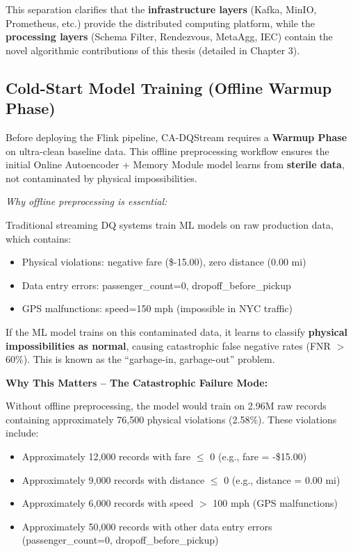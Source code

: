 This separation clarifies that the \textbf{infrastructure layers} (Kafka, MinIO, Prometheus, etc.) provide the distributed computing platform, while the \textbf{processing layers} (Schema Filter, Rendezvous, MetaAgg, IEC) contain the novel algorithmic contributions of this thesis (detailed in Chapter 3).

\subsection{Cold-Start Model Training (Offline Warmup Phase)}

Before deploying the Flink pipeline, CA-DQStream requires a \textbf{Warmup Phase} on ultra-clean baseline data. This offline preprocessing workflow ensures the initial Online Autoencoder + Memory Module model learns from \textbf{sterile data}, not contaminated by physical impossibilities.

\textit{Why offline preprocessing is essential:}

Traditional streaming DQ systems train ML models on raw production data, which contains:
\begin{itemize}
    \item Physical violations: negative fare (\$-15.00), zero distance (0.00 mi)
    \item Data entry errors: passenger\_count=0, dropoff\_before\_pickup
    \item GPS malfunctions: speed=150 mph (impossible in NYC traffic)
\end{itemize}

If the ML model trains on this contaminated data, it learns to classify \textbf{physical impossibilities as normal}, causing catastrophic false negative rates (FNR $>$ 60\%). This is known as the ``garbage-in, garbage-out'' problem.

\textbf{Why This Matters -- The Catastrophic Failure Mode:}

Without offline preprocessing, the model would train on 2.96M raw records containing approximately 76,500 physical violations (2.58\%). These violations include:
\begin{itemize}
    \item Approximately 12,000 records with fare $\leq$ 0 (e.g., fare = -\$15.00)
    \item Approximately 9,000 records with distance $\leq$ 0 (e.g., distance = 0.00 mi)
    \item Approximately 6,000 records with speed $>$ 100 mph (GPS malfunctions)
    \item Approximately 50,000 records with other data entry errors (passenger\_count=0, dropoff\_before\_pickup)
\end{itemize}

